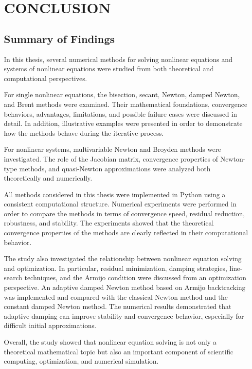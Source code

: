 \chapter{\MakeUppercase{Conclusion}}

\section{Summary of Findings}

In this thesis, several numerical methods for solving nonlinear equations and systems of nonlinear equations were studied from both theoretical and computational perspectives.

For single nonlinear equations, the bisection, secant, Newton, damped Newton, and Brent methods were examined. Their mathematical foundations, convergence behaviors, advantages, limitations, and possible failure cases were discussed in detail. In addition, illustrative examples were presented in order to demonstrate how the methods behave during the iterative process.

For nonlinear systems, multivariable Newton and Broyden methods were investigated. The role of the Jacobian matrix, convergence properties of Newton-type methods, and quasi-Newton approximations were analyzed both theoretically and numerically.

All methods considered in this thesis were implemented in Python using a consistent computational structure. Numerical experiments were performed in order to compare the methods in terms of convergence speed, residual reduction, robustness, and stability. The experiments showed that the theoretical convergence properties of the methods are clearly reflected in their computational behavior.

The study also investigated the relationship between nonlinear equation solving and optimization. In particular, residual minimization, damping strategies, line-search techniques, and the Armijo condition were discussed from an optimization perspective. An adaptive damped Newton method based on Armijo backtracking was implemented and compared with the classical Newton method and the constant damped Newton method. The numerical results demonstrated that adaptive damping can improve stability and convergence behavior, especially for difficult initial approximations.

Overall, the study showed that nonlinear equation solving is not only a theoretical mathematical topic but also an important component of scientific computing, optimization, and numerical simulation.


